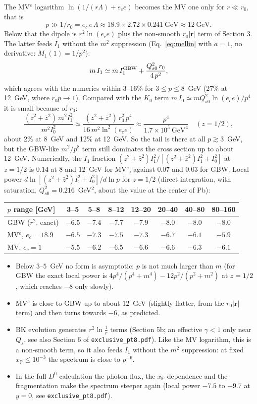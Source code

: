 \documentclass[12pt]{article}
\begin{document}
The MV$^e$ logarithm $\ln(1/(r\Lambda)+e_ce)$ becomes the MV one only for $r\ll r_0$, that is
\[
  p\gg 1/r_0=e_c\,e\,\Lambda\approx18.9\times2.72\times0.241~\text{GeV}\approx12~\text{GeV}.
\]
Below that the dipole is $r^2\ln(e_ce)$ plus the non-smooth $r_0|\mathbf r|$ term of Section 3. The
latter feeds $I_1$ without the $m^2$ suppression (Eq.~\eqref{eq:mellin} with $a=1$, no derivative: $M_1(1)=1/p^2$):
\[
  m\,I_1\simeq m\,I_1^{\rm GBW}+\frac{Q_{s0}^2\,r_0}{4\,p^2},
\]
which agrees with the numerics within 3--16\% for $3\le p\le8$~GeV (27\% at 12~GeV, where $r_0p\to1$).
Compared with the $K_0$ term $m\,I_0\simeq mQ_{s0}^2\ln(e_ce)/p^4$ it is small because of $r_0$:
\[
  \frac{(z^2+\bar z^2)\,m^2I_1^2}{m^2I_0^2}\simeq\frac{(z^2+\bar z^2)\,r_0^2\,p^4}{16\,m^2\ln^2(e_ce)}
  \approx\frac{p^4}{1.7\times10^5~\text{GeV}^4}\quad(z=1/2),
\]
about 2\% at 8~GeV and 12\% at 12~GeV. So the tail is there at all $p\gtrsim3$~GeV, but the GBW-like
$m^2/p^8$ term still dominates the cross section up to about 12~GeV. Numerically, the $I_1$ fraction
$(z^2+\bar z^2)I_1^2/[(z^2+\bar z^2)I_1^2+I_0^2]$ at $z=1/2$ is $0.14$ at 8 and 12~GeV for MV$^e$, against
$0.07$ and $0.03$ for GBW. Local power
$d\ln[(z^2+\bar z^2)I_1^2+I_0^2]/d\ln p$ for $z=1/2$ (direct integration, with saturation, $Q_{s0}^2=0.216$~GeV$^2$,
about the value at the center of Pb):
\begin{center}
\begin{tabular}{lccccccc}
\toprule
$p$ range [GeV] & 3--5 & 5--8 & 8--12 & 12--20 & 20--40 & 40--80 & 80--160 \\
\midrule
GBW ($r^2$, exact)         & $-6.5$ & $-7.4$ & $-7.7$ & $-7.9$ & $-8.0$ & $-8.0$ & $-8.0$ \\
MV$^e$, $e_c=18.9$         & $-6.5$ & $-7.3$ & $-7.5$ & $-7.3$ & $-6.7$ & $-6.1$ & $-5.9$ \\
MV, $e_c=1$                & $-5.5$ & $-6.2$ & $-6.5$ & $-6.6$ & $-6.6$ & $-6.3$ & $-6.1$ \\
\bottomrule
\end{tabular}
\end{center}
\begin{itemize}
\item Below $3$--$5$~GeV no form is asymptotic: $p$ is not much larger than $m$ (for GBW the exact local
power is $4p^4/(p^4+m^4)-12p^2/(p^2+m^2)$ at $z=1/2$, which reaches $-8$ only slowly).
\item MV$^e$ is close to GBW up to about $12$~GeV (slightly flatter, from the $r_0|\mathbf r|$ term) and then
turns towards $-6$, as predicted.
\item BK evolution generates $r^2\ln\frac1r$ terms (Section 5b; an effective $\gamma<1$ only near
$Q_s$, see also Section 6 of \texttt{exclusive\_pt8.pdf}). Like the MV logarithm, this is a non-smooth
term, so it also feeds $I_1$ without the $m^2$ suppression: at fixed $x_{\mathbb P}\le10^{-3}$ the spectrum
is close to $p^{-6}$.
\item In the full $D^0$ calculation the photon flux, the $x_{\mathbb P}$ dependence and the fragmentation make
the spectrum steeper again (local power $-7.5$ to $-9.7$ at $y=0$, see \texttt{exclusive\_pt8.pdf}).
\end{itemize}
\end{document}
